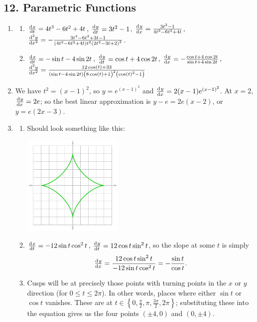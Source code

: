 \subsection*{12. Parametric Functions}
\begin{enumerate}
  \item
    \begin{enumerate}
      \item $ \od{x}{t} = 4t^3 - 6t^2 + 4t $, $ \od{y}{t} = 3t^2 - 1 $, $ \od{y}{x} = \frac{3t^2 - 1}{4t^3 - 6t^2 + 4t} $,
            $ \od[2]{y}{x} = -\frac{3 t^4-6 t^2+3 t-1}{(4t^3 - 6t^2 + 4t)t^2 {\left(2 t^2-3 t+2\right)}^2} $.
      \item $ \od{x}{t} = -\sin t - 4\sin 2t $, $ \od{y}{t} = \cos t + 4\cos 2t $, $ \od{y}{x} = -\frac{\cos t + 4\cos 2t}{\sin t + 4\sin 2t} $,
            $ \od[2]{y}{x} = \frac{12 \cos\left(t\right)+33}{ (\sin t - 4\sin 2t) {\left(8 \cos\left(t\right)+1\right)}^2 \left({\cos\left(t\right)}^2-1\right)} $
    \end{enumerate}
  \item We have $ t^2 = (x - 1)^2 $, so $ y = e^{(x - 1)^2} $ and $ \od{y}{x} = 2(x-1) e^{(x-1)^2} $. At $ x = 2 $, $ \od{y}{x} = 2e $; so the
        best linear approximation is $ y - e = 2e(x - 2) $, or $ y =  e(2x - 3) $.
  \item
    \begin{enumerate}
      \item Should look something like this:

            \begin{center}
              \includegraphics[width=0.4\textwidth]{astroid}
            \end{center}
      \item $ \od{x}{t} = -12\sin t \cos^2 t $, $ \od{y}{t} = 12\cos t \sin^2 t $, so the slope at some $ t $ is simply
            \begin{displaymath}
              \od{y}{x} = \frac{12\cos t \sin^2 t}{-12\sin t \cos^2 t} = -\frac{\sin t}{\cos t}.
            \end{displaymath}
      \item Cusps will be at precisely those points with turning points in the $ x $ or $ y $ direction (for $ 0 \leq t \leq 2\pi $). In
            other words, places where either $ \sin t $ or $ \cos t $ vanishes. These are at $ t \in \left\{0, \frac{\pi}{2}, \pi, \frac{3\pi}{2}, 2\pi\right\} $;
            substituting these into the equation gives us the four points $ (\pm 4, 0) $ and $ (0, \pm 4) $.
    \end{enumerate}
\end{enumerate}


